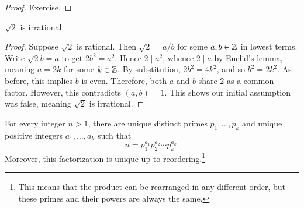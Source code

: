 \documentclass[11pt,a4paper]{article}
\begin{document}
\begin{proof}
    Exercise.
\end{proof}

\begin{prop}
    \(\sqrt{2}\) is irrational.
\end{prop}

\begin{proof}
    Suppose \(\sqrt{2}\) is rational. 
    Then \(\sqrt{2}=a/b\) for some \(a,b\in \mathbb{Z}\) in lowest terms.
    Write \(\sqrt{2} b = a\) to get \(2b^2 = a^2\).
    Hence \(2\mid a^2\),
    whence \(2\mid a\) by Euclid's lemma, meaning  \(a=2k\) for some \(k\in\mathbb{Z}\).
    By substitution, \(2b^2 = 4k^2\), and so \(b^2= 2k^2\).
    As before, this implies  \(b\) is even.
    Therefore,  both \(a\) and \(b\) share \(2\) as a common factor. 
    However, this  contradicts \((a,b) = 1\).
    This shows our initial assumption was false, meaning \(\sqrt{2}\) is irrational.
\end{proof}


\begin{teo}
   For every integer $n>1$, there are unique distinct primes $p_1, \ldots, p_k $ and unique positive integers $a_1, \ldots, a_k $ such that
\[
n=p_1^{a_1} p_2^{a_2} \cdots p_k^{a_k}.
\] 
Moreover, this factorization is unique up to reordering.\footnote{ This means that the product  can be rearranged in any  different order, but these primes and their powers are always the same.}
\end{teo}
\end{document}
